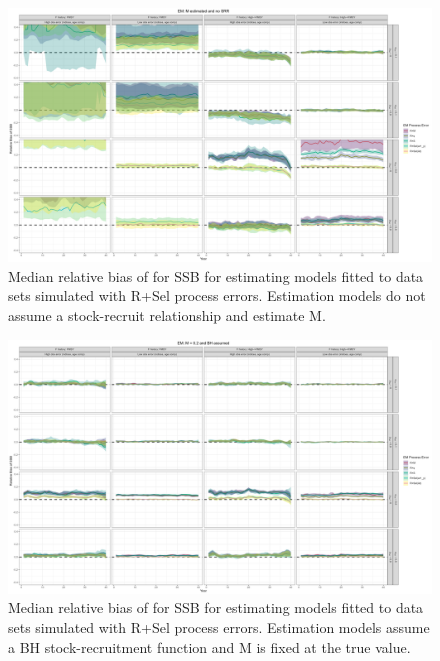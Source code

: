 \documentclass[
  12pt,
]{article}
\begin{document}
\begin{landscape}
\begin{figure}
\caption{Median relative bias of for SSB for estimating models fitted to data sets simulated with R+Sel process errors. Estimation models do not assume a stock-recruit relationship and estimate M.}\label{Sel_om_em_R_ME_relbias_ssb}
\begin{center}
\includegraphics[width = \textwidth]{Sel_om_R_ME_relbias_ssb.png}
\end{center}
\end{figure}
\end{landscape}

\begin{landscape}
\begin{figure}
\caption{Median relative bias of for SSB for estimating models fitted to data sets simulated with R+Sel process errors. Estimation models assume a BH stock-recruitment function and M is fixed at the true value.}\label{Sel_om_em_BH_MF_relbias_ssb}
\begin{center}
\includegraphics[width = \textwidth]{Sel_om_BH_MF_relbias_ssb.png}
\end{center}
\end{figure}
\end{landscape}
\end{document}
